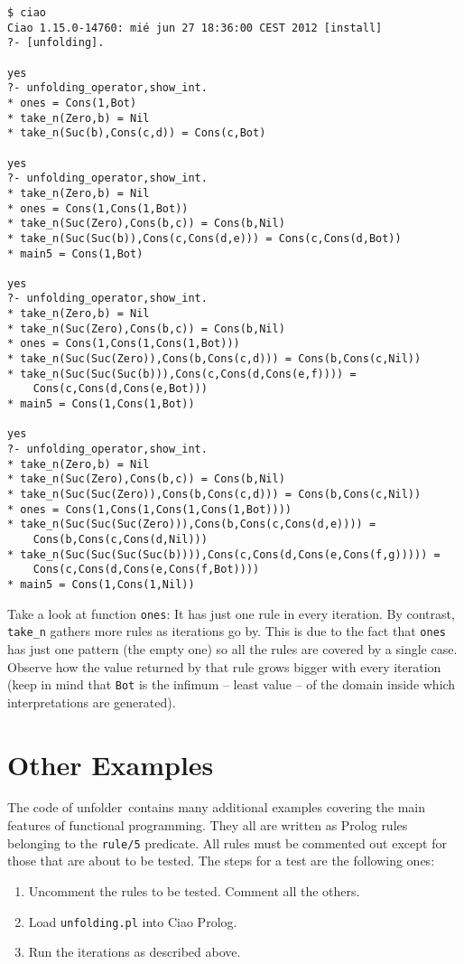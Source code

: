 \documentclass[11pt,a4paper,twoside,openright]{book}
\newcommand{\unfolder}{{\textsf{unfolder~}}}
\begin{document}
\begin{verbatim}
$ ciao
Ciao 1.15.0-14760: mié jun 27 18:36:00 CEST 2012 [install]
?- [unfolding].

yes
?- unfolding_operator,show_int.
* ones = Cons(1,Bot)
* take_n(Zero,b) = Nil
* take_n(Suc(b),Cons(c,d)) = Cons(c,Bot)

yes
?- unfolding_operator,show_int.
* take_n(Zero,b) = Nil
* ones = Cons(1,Cons(1,Bot))
* take_n(Suc(Zero),Cons(b,c)) = Cons(b,Nil)
* take_n(Suc(Suc(b)),Cons(c,Cons(d,e))) = Cons(c,Cons(d,Bot))
* main5 = Cons(1,Bot)

yes
?- unfolding_operator,show_int.
* take_n(Zero,b) = Nil
* take_n(Suc(Zero),Cons(b,c)) = Cons(b,Nil)
* ones = Cons(1,Cons(1,Cons(1,Bot)))
* take_n(Suc(Suc(Zero)),Cons(b,Cons(c,d))) = Cons(b,Cons(c,Nil))
* take_n(Suc(Suc(Suc(b))),Cons(c,Cons(d,Cons(e,f)))) = 
    Cons(c,Cons(d,Cons(e,Bot)))
* main5 = Cons(1,Cons(1,Bot))

yes
?- unfolding_operator,show_int.
* take_n(Zero,b) = Nil
* take_n(Suc(Zero),Cons(b,c)) = Cons(b,Nil)
* take_n(Suc(Suc(Zero)),Cons(b,Cons(c,d))) = Cons(b,Cons(c,Nil))
* ones = Cons(1,Cons(1,Cons(1,Cons(1,Bot))))
* take_n(Suc(Suc(Suc(Zero))),Cons(b,Cons(c,Cons(d,e)))) = 
    Cons(b,Cons(c,Cons(d,Nil)))
* take_n(Suc(Suc(Suc(Suc(b)))),Cons(c,Cons(d,Cons(e,Cons(f,g))))) = 
    Cons(c,Cons(d,Cons(e,Cons(f,Bot))))
* main5 = Cons(1,Cons(1,Nil))
\end{verbatim}

\noindent
Take a look at function {\tt ones}: It has just one rule in every
iteration. By contrast, {\tt take\_n} gathers more rules as iterations
go by. This is due to the fact that {\tt ones} has just one pattern
(the empty one) so all the rules are covered by a single case. Observe
how the value returned by that rule grows bigger with every iteration
(keep in mind that {\tt Bot} is the infimum -- least value -- of the
domain inside which interpretations are generated).

\section{Other Examples}

The code of \unfolder contains many additional examples covering the
main features of functional programming. They all are written as
Prolog rules belonging to the {\tt rule/5} predicate. All rules must
be commented out except for those that are about to be tested. The
steps for a test are the following ones:

\begin{enumerate}
\item
Uncomment the rules to be tested. Comment all the others.

\item
Load {\tt unfolding.pl} into Ciao Prolog.

\item
Run the iterations as described above.
\end{enumerate}
\end{document}
